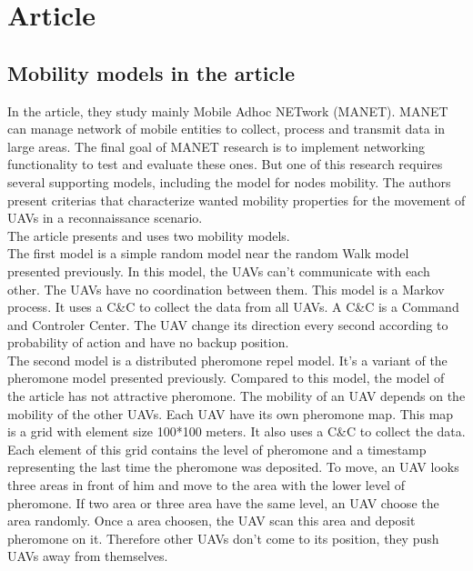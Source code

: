 \part{Article}

\setcounter{chapter}{0}

\chapter{Mobility models in the article}

In the article, they study mainly Mobile Adhoc NETwork (MANET). MANET can manage network of mobile entities to collect, process and transmit data in large areas. The final goal of MANET research is to implement networking functionality to test and evaluate these ones. But one of this research requires several supporting models, including the model for nodes mobility. The authors present criterias that characterize wanted mobility properties for the movement of UAVs in a reconnaissance scenario.\\

\noindent The article presents and uses two mobility models.\\

The first model is a simple random model near the random Walk model presented previously. In this model, the UAVs can't communicate with each other. The UAVs have no coordination between them. This model is a Markov process. It uses a C\&C to collect the data from all UAVs. A C\&C is a Command and Controler Center.  The UAV change its direction every second according to probability of action and have no backup position.\\

The second model is a distributed pheromone repel model. It's a variant of the pheromone model presented previously. Compared to this model, the model of the article has not attractive pheromone. The mobility of an UAV depends on the mobility of the other UAVs. Each UAV have its own pheromone map. This map is a grid with element size 100*100 meters. It also uses a C\&C to collect the data. Each element of this grid contains the level of pheromone and a timestamp representing the last time the pheromone was deposited. To move, an UAV looks three areas in front of him and move to the area with the lower level of pheromone. If two area or three area have the same level, an UAV choose the area randomly. Once a area choosen, the UAV scan this area and deposit pheromone on it. Therefore other UAVs don't come to its position, they push UAVs away from themselves.

